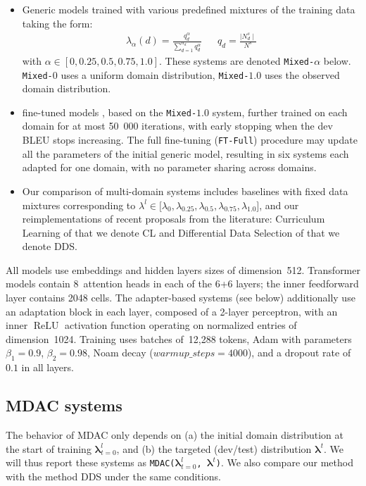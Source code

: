 \documentclass[11pt]{article}
\newcommand{\system}[1]{\texttt{{#1}}}
\newcommand{\vlambda}{\ensuremath{\boldsymbol\lambda}\xspace} %
\begin{document}
\begin{itemize}
\itemsep0em 
\item Generic models trained with various predefined mixtures of the training data taking the form:
\begin{align} \label{mixture:trn}
\lambda_{\alpha}(d) = \frac{q_d^{\alpha}}{\displaystyle{\mathop{\sum}_{d=1}^{n_d}q_d^{\alpha}}} &&
q_d = \frac{\mid N^{s}_d \mid}{\displaystyle{N^{s}}} %
\end{align} \setlength{\abovedisplayskip}{2pt}
\setlength{\belowdisplayskip}{2pt} 
with $\alpha \in [0,0.25,0.5,0.75,1.0]$. These systems are denoted \system{Mixed-$\alpha$} below. \system{Mixed-$0$} uses a uniform domain distribution, \system{Mixed-$1.0$} uses the observed domain distribution.
\item fine-tuned models \cite{Luong15stanford,Freitag16fast}, based on the \system{Mixed-$1.0$} system, further trained on each domain for at most 50~000 iterations, with early stopping when the dev BLEU stops increasing. The full fine-tuning (\system{FT-Full}) procedure may update all the parameters of the initial generic model, resulting in six systems each adapted for one domain, with no parameter sharing across domains.
 
\item Our comparison of multi-domain systems includes baselines with fixed data mixtures corresponding to $\lambda^l \in \big[ \lambda_0, \lambda_{0.25}, \lambda_{0.5}, \lambda_{0.75}, \lambda_{1.0}\big]$, and our reimplementations of recent proposals from the literature: Curriculum Learning of \cite{Zhang19curriculum} that we denote CL and Differential Data Selection of \cite{Wang20balancing} that we denote DDS.
\end{itemize}

All models use embeddings and hidden layers sizes of dimension~512. Transformer models contain 8~attention heads in each of the 6+6 layers; the inner feedforward layer contains 2048 cells. The adapter-based systems (see below) additionally use an adaptation block in each layer, composed of a 2-layer perceptron, with an inner $\operatorname{ReLU}$ activation function operating on normalized entries of dimension~1024. 
Training uses batches of~12,288 tokens, Adam with parameters $\beta_1=0.9$, $\beta_2= 0.98$, Noam decay ($warmup\_steps=4000$), and a dropout rate of $0.1$ in all layers.

\subsection{MDAC systems} \label{ssec:dds-sys}
The behavior of MDAC only depends on (a) the initial domain distribution at the start of training $\vlambda^{l}_{t=0}$, and (b) the targeted (dev/test) distribution $\vlambda^{t}$. We will thus report these systems as \system{MDAC($\vlambda^{l}_{t=0}$, $\vlambda^{t}$)}. We also compare our method with the method DDS under the same conditions.
\end{document}
